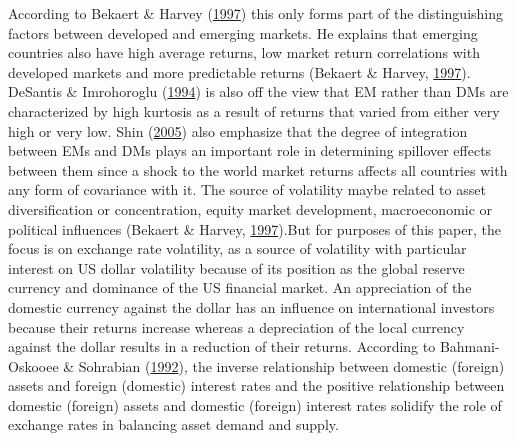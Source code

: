 \documentclass[11pt,preprint, authoryear]{elsarticle}
\numberwithin{equation}{section}
\numberwithin{figure}{section}
\numberwithin{table}{section}
\begin{document}
According to Bekaert \& Harvey
(\protect\hyperlink{ref-bekaert1997}{1997}) this only forms part of the
distinguishing factors between developed and emerging markets. He
explains that emerging countries also have high average returns, low
market return correlations with developed markets and more predictable
returns (Bekaert \& Harvey, \protect\hyperlink{ref-bekaert1997}{1997}).
DeSantis \& Imrohoroglu (\protect\hyperlink{ref-desantis1994}{1994}) is
also off the view that EM rather than DMs are characterized by high
kurtosis as a result of returns that varied from either very high or
very low. Shin (\protect\hyperlink{ref-shin2005}{2005}) also emphasize
that the degree of integration between EMs and DMs plays an important
role in determining spillover effects between them since a shock to the
world market returns affects all countries with any form of covariance
with it. The source of volatility maybe related to asset diversification
or concentration, equity market development, macroeconomic or political
influences (Bekaert \& Harvey,
\protect\hyperlink{ref-bekaert1997}{1997}).But for purposes of this
paper, the focus is on exchange rate volatility, as a source of
volatility with particular interest on US dollar volatility because of
its position as the global reserve currency and dominance of the US
financial market. An appreciation of the domestic currency against the
dollar has an influence on international investors because their returns
increase whereas a depreciation of the local currency against the dollar
results in a reduction of their returns. According to Bahmani-Oskooee \&
Sohrabian (\protect\hyperlink{ref-bahmani1992}{1992}), the inverse
relationship between domestic (foreign) assets and foreign (domestic)
interest rates and the positive relationship between domestic (foreign)
assets and domestic (foreign) interest rates solidify the role of
exchange rates in balancing asset demand and supply.
\end{document}

